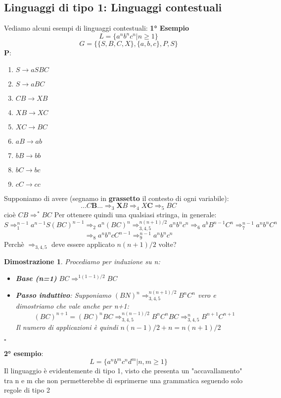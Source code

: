 \documentclass[12pt]{article}
\newtheorem{Dimostrazione}{Dimostrazione}[subsection]
\begin{document}
\subsection{Linguaggi di tipo 1: Linguaggi contestuali}
Vediamo alcuni esempi di linguaggi contestuali: \newline
\textbf{1° Esempio}
$$L = \{a^n b^n c^n | n \geq 1 \}$$
$$G = \bigl\{\{S, B, C, X\}, \{a,b,c\}, P, S \bigl\}$$
\textbf{P}:
\begin{enumerate}
    \item $S \to aSBC$
    \item $S \to aBC$
    \item $CB \to XB$
    \item $XB \to XC$
    \item $XC \to BC$
    \item $aB \to ab$
    \item $bB \to bb$
    \item $bC \to bc$
    \item $cC \to cc$
\end{enumerate}
Supponiamo di avere (segnamo in \textbf{grassetto} il contesto di ogni variabile):
$$...C\textbf{B}...\Rightarrow_3 \textbf{X}B \Rightarrow_4 X\textbf{C} \Rightarrow_5 BC$$
cioè $CB \Rightarrow^* BC$
Per ottenere quindi una qualsiasi stringa, in generale:
$$S \Rightarrow_1^{n-1} a^{n-1}S(BC)^{n-1} \Rightarrow_2 a^n(BC)^n \Rightarrow_{3,4,5}^{n(n+1)/2}a^n b^n c^n \Rightarrow_6 a^bB^{n-1}C^n \Rightarrow_7^{n-1} a^n b^n C^n$$
$$\Rightarrow_8 a^n b^n cC^{n-1} \Rightarrow_9^{n-1} a^n b^n c^n$$
Perchè $\Rightarrow_{3,4,5}$ deve essere applicato $n(n+1)/2$ volte?
\begin{Dimostrazione}
Procediamo per induzione su n:
\begin{itemize}
    \item \textbf{Base (n=1)} $BC \Rightarrow^{1(1-1)/2} BC$
    \item \textbf{Passo induttivo}: Supponiamo $(BN)^n \Rightarrow_{3,4,5}^{n(n+1)/2} B^n C^n$ vero e dimostriamo che vale anche per n+1:
    $$(BC)^{n+1} = (BC)^n BC \Rightarrow_{3,4,5}^{n(n-1)/2} B^n C^n BC \Rightarrow_{3,4,5}^{n} B^{n+1} C^{n+1}$$
    Il numero di applicazioni è quindi $n(n-1)/2 + n = n(n+1)/2 $
\end{itemize}
\begin{flushright}
    $\square$
\end{flushright}
\end{Dimostrazione}
\textbf{2° esempio}:
$$L = \{a^n b^m c^n d^m | n, m \geq 1\}$$
Il linguaggio è evidentemente di tipo 1, visto che presenta un "accavallamento" tra n e m che non permetterebbe di esprimerne una grammatica seguendo solo regole di tipo 2
\newpage
\end{document}
